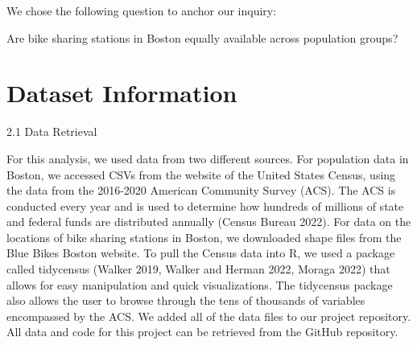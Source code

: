 \documentclass[
  12pt,
]{article}
\begin{document}
We chose the following question to anchor our inquiry:

\begin{center}
Are bike sharing stations in Boston equally available across population groups?
\end{center}

\newpage

\hypertarget{dataset-information}{%
\section{Dataset Information}\label{dataset-information}}

2.1 Data Retrieval

For this analysis, we used data from two different sources. For
population data in Boston, we accessed CSVs from the website of the
United States Census, using the data from the 2016-2020 American
Community Survey (ACS). The ACS is conducted every year and is used to
determine how hundreds of millions of state and federal funds are
distributed annually (Census Bureau 2022). For data on the locations of
bike sharing stations in Boston, we downloaded shape files from the Blue
Bikes Boston website. To pull the Census data into R, we used a package
called tidycensus (Walker 2019, Walker and Herman 2022, Moraga 2022)
that allows for easy manipulation and quick visualizations. The
tidycensus package also allows the user to browse through the tens of
thousands of variables encompassed by the ACS. We added all of the data
files to our project repository. All data and code for this project can
be retrieved from the GitHub repository.
\end{document}
